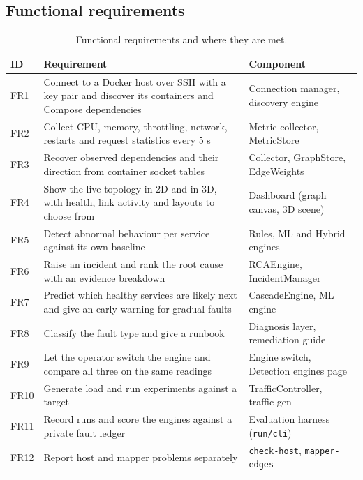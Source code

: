 \subsection{Functional requirements}
\begin{table}[!htbp]
\centering
\caption{Functional requirements and where they are met.}
\label{tab:fr}
\small
\renewcommand{\arraystretch}{1.2}
\begin{tabularx}{\textwidth}{>{\raggedright\arraybackslash}p{1.1cm}>{\raggedright\arraybackslash}X>{\raggedright\arraybackslash}p{4.2cm}}
\toprule
\textbf{ID} & \textbf{Requirement} & \textbf{Component}\\
\midrule
FR1 & Connect to a Docker host over SSH with a key pair and discover its containers and Compose dependencies & Connection manager, discovery engine\\
FR2 & Collect CPU, memory, throttling, network, restarts and request statistics every 5 s & Metric collector, MetricStore\\
FR3 & Recover observed dependencies and their direction from container socket tables & Collector, GraphStore, EdgeWeights\\
FR4 & Show the live topology in 2D and in 3D, with health, link activity and layouts to choose from & Dashboard (graph canvas, 3D scene)\\
FR5 & Detect abnormal behaviour per service against its own baseline & Rules, ML and Hybrid engines\\
FR6 & Raise an incident and rank the root cause with an evidence breakdown & RCAEngine, IncidentManager\\
FR7 & Predict which healthy services are likely next and give an early warning for gradual faults & CascadeEngine, ML engine\\
FR8 & Classify the fault type and give a runbook & Diagnosis layer, remediation guide\\
FR9 & Let the operator switch the engine and compare all three on the same readings & Engine switch, Detection engines page\\
FR10 & Generate load and run experiments against a target & TrafficController, traffic-gen\\
FR11 & Record runs and score the engines against a private fault ledger & Evaluation harness (\texttt{run/cli})\\
FR12 & Report host and mapper problems separately & \texttt{check-host}, \texttt{mapper-edges}\\
\bottomrule
\end{tabularx}
\end{table}

